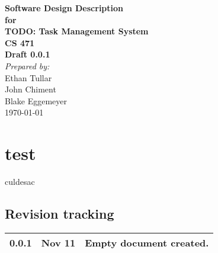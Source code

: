 \documentclass[12pt,a4paper]{article}
\begin{document}


\begin{titlepage}
\begin{flushright} 
{\LARGE \bfseries Software Design Description}\\[1.2cm]
{\large \bfseries for}\\[1.2cm]
{\huge \bfseries TODO: Task Management System}\\[1.2cm]
{\large \bfseries CS 471}\\
\vfill
{\large \bfseries Draft 0.0.1}\\[2cm]
\emph{Prepared by:} \\
Ethan Tullar\\
John Chiment\\
Blake Eggemeyer \\ [3cm]
{\large \today}
\end{flushright}
\end{titlepage}
\setcounter{tocdepth}{3}
\setcounter{secnumdepth}{4}
\tableofcontents
\newpage


\section{test}
\gls{culdesac}

\subsection{Revision tracking}
\begin{tabular}{|l|r|p{5.5in}|}
\hline
0.0.1 & Nov 11 & Empty document created.\\
\hline
\end{tabular}

\printglossaries
\end{document}
